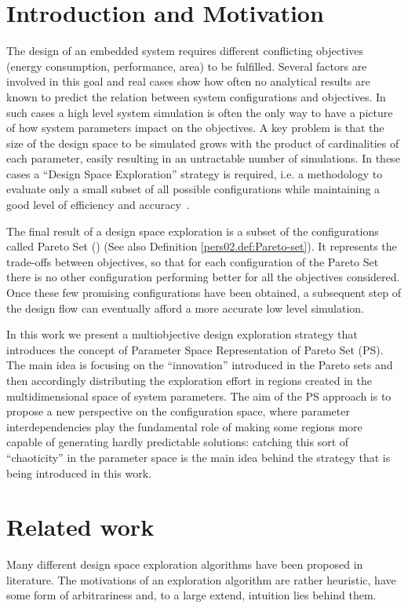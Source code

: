 
\section{Introduction and Motivation}

The design of an embedded system requires different conflicting
objectives (energy consumption, performance, area) to be fulfilled.
Several factors are involved in this goal and real cases show how
often no analytical results are known to predict the relation between
system configurations and objectives. In such cases a high level
system simulation is often the only way to have a picture of how system
parameters impact on the objectives.  A key problem is that the size
of the design space to be simulated grows with the product of
cardinalities of each parameter, easily resulting in an untractable number
of simulations. In these cases a ``Design Space
Exploration'' strategy is required, i.e. a methodology to evaluate
only a small subset of all possible configurations while maintaining a
good level of efficiency and accuracy~\cite{surviving_soc}.

The final result of a design space exploration is a subset of the
configurations called Pareto Set (\cite{pareto}) (See also Definition
\ref{pers02.def:Pareto-set}). It represents the trade-offs between
objectives, so that for each configuration of the Pareto Set there is no
other configuration performing better for all the objectives
considered. Once these few promising configurations have been obtained, a
subsequent step of the design flow can eventually afford a more
accurate low level simulation.

In this work we present a multiobjective design exploration strategy
that introduces the concept of Parameter Space Representation of
Pareto Set (PS). The main idea is focusing on the ``innovation''
introduced in the Pareto sets and then accordingly distributing the
exploration effort in regions created in the multidimensional space of
system parameters. The aim of the PS approach is to propose a new
perspective on the configuration space, where parameter
interdependencies play the fundamental role of making some regions
more capable of generating hardly predictable solutions: catching this
sort of ``chaoticity'' in the parameter space is the main idea behind
the strategy that is being introduced in this work.


\section{Related work}
Many different design space exploration algorithms have been proposed
in literature.  The motivations of an exploration
algorithm are rather heuristic, have some form of arbitrariness and,
to a large extend, intuition lies behind them.


